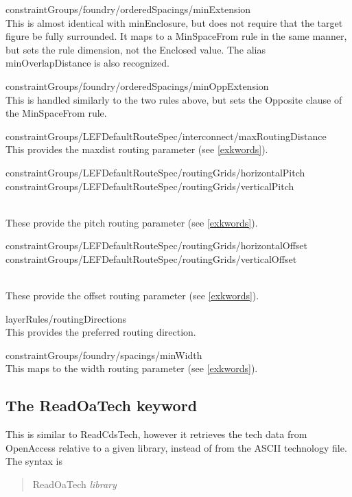 \begin{description}
\item{\vt constraintGroups/foundry/orderedSpacings/minExtension}\\
This is almost identical with {\vt minEnclosure}, but does not require
that the target figure be fully surrounded.  It maps to a {\vt
MinSpaceFrom} rule in the same manner, but sets the rule dimension,
not the {\vt Enclosed} value.  The alias {\vt minOverlapDistance} is
also recognized.

\item{\vt constraintGroups/foundry/orderedSpacings/minOppExtension}\\
This is handled similarly to the two rules above, but sets the {\vt
Opposite} clause of the {\vt MinSpaceFrom} rule.

\item{\vt constraintGroups/LEFDefaultRouteSpec/interconnect/maxRoutingDistance}\\
This provides the {\et maxdist} routing parameter (see \ref{exkwords}).

\item{\parbox{4in}{\vt constraintGroups/LEFDefaultRouteSpec/routingGrids/horizontalPitch\newline
constraintGroups/LEFDefaultRouteSpec/routingGrids/verticalPitch}}\\
These provide the {\et pitch} routing parameter (see \ref{exkwords}).

\item{\parbox{4in}{\vt constraintGroups/LEFDefaultRouteSpec/routingGrids/horizontalOffset\newline
constraintGroups/LEFDefaultRouteSpec/routingGrids/verticalOffset}}\\
These provide the {\vt offset} routing parameter (see \ref{exkwords}).

\item{\vt layerRules/routingDirections}\\
This provides the preferred routing direction.

\item{\vt constraintGroups/foundry/spacings/minWidth}\\
This maps to the {\et width} routing parameter (see \ref{exkwords}).
\end{description}


\subsection{The {\vt ReadOaTech} keyword}
This is similar to {\vt ReadCdsTech}, however it retrieves the tech
data from OpenAccess relative to a given library, instead of from the
ASCII technology file.  The syntax is
\begin{quote}
{\vt ReadOaTech} {\it library}
\end{quote}
 

